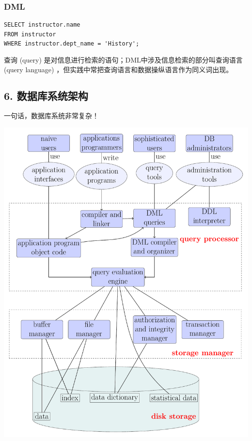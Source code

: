 \documentclass[aspectratio=169, 14pt]{beamer}
\begin{document}
\begin{frame}[fragile]
    \frametitle{DML}
    \begin{verbatim}
SELECT instructor.name
FROM instructor
WHERE instructor.dept_name = 'History';   
    \end{verbatim} 
    查询 (query) 是对信息进行检索的语句；DML中涉及信息检索的部分叫\alert{查询语言 (query language)} ，但实践中常把查询语言和数据操纵语言作为同义词出现。
\end{frame}

\begin{frame}
    \section{\textcolor{darkmidnightblue}{6. 数据库系统架构}}  
    一句话，数据库系统非常复杂！
\end{frame}

\begin{frame}
    \begin{center}
        \includegraphics[height=.99\paperheight]{image/system}
    \end{center}

    

\end{frame}
\end{document}

